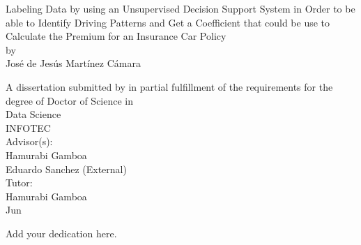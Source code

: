 \documentclass[12pt]{report} %
\begin{document}
\begin{titlepage}
	\begin{center}
		\begin{Large}
			Labeling Data by using an Unsupervised Decision Support System in Order to be able to Identify Driving Patterns and Get a Coefficient that could be use to Calculate the Premium for an Insurance Car Policy\\			
			\bigskip
			by\\
			\bigskip
			José de Jesús Martínez Cámara\\
		\end{Large}
	    \vspace{2cm}	
	    \begin{Large}
            A dissertation submitted by in partial fulfillment of the requirements for the degree of Doctor of Science in\\
            \bigskip
            Data Science\\
		    \vspace{2cm}
		    INFOTEC\\
		    \vspace{2cm}
		    Advisor(s):\\
		    \bigskip
		    Hamurabi Gamboa\\
		    Eduardo Sanchez (External)\\
		    \bigskip
		    Tutor:\\
		    \bigskip
		    Hamurabi Gamboa\\
		    \bigskip
		    Jun\\
		 \end{Large}
		 
	\end{center}
	\end{titlepage}
	

\newpage
\thispagestyle{empty}
\begin{flushright}
Add your dedication here.
\end{flushright}

\end{document}
